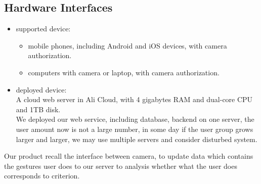 \documentclass[16pt]{scrreprt}
\begin{document}
\subsection{Hardware Interfaces}
\begin{itemize}
    \item supported device:\\
        \begin{itemize}
            \item mobile phones, including Android and iOS devices, with camera authorization.
            \item computers with camera or laptop, with camera authorization.
        \end{itemize}

    \item deployed device:\\
        A cloud web server in Ali Cloud, with 4 gigabytes RAM and dual-core CPU and 1TB disk.\\
        We deployed our web service, including database, backend on one server, the user amount now is not a large number, in some day if the user group grows larger and larger, we may use multiple servers and consider disturbed system.  
\end{itemize}
    Our product recall the interface between camera, to update data which contains the gestures user does to our server to analysis whether what the user does corresponds to criterion.
\end{document}
